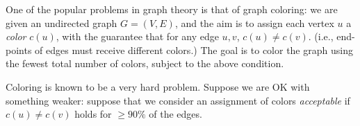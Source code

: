 \documentclass[addpoints]{exam}
\begin{document}
\begin{questions}
\begin{parts}
\end{parts}

One of the popular problems in graph theory is that of graph coloring: we are given an undirected graph $G = (V, E)$, and the aim is to assign each vertex $u$ a {\em color} $c(u)$, with the guarantee that for any edge $u, v$, $c(u) \ne c(v)$.  (i.e., end-points of edges must receive different colors.) The goal is to color the graph using the fewest total number of colors, subject to the above condition.

Coloring is known to be a very hard problem. Suppose we are OK with something weaker: suppose that we consider an assignment of colors {\em acceptable} if $c(u) \ne c(v)$ holds for $\ge 90\%$ of the edges.


\begin{parts}


\end{parts}
\end{questions}
\end{document}
